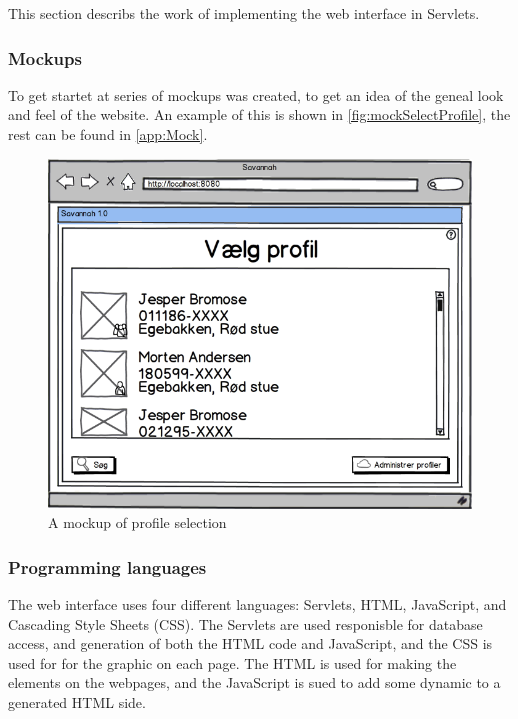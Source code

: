 This section describs the work of implementing the web interface in Servlets.

\subsubsection{Mockups}
To get startet at series of mockups was created, to get an idea of the geneal look and feel of the website. An example of this is shown in \autoref{fig:mockSelectProfile}, the rest can be found in \autoref{app:Mock}.

\begin{figure}[htbp]
	\centering
		\includegraphics[width=1.00\textwidth]{images/mockSelectProfile.png}
	\caption{A mockup of profile selection}
	\label{fig:mockSelectProfile}
\end{figure}

\subsubsection{Programming languages}
The web interface uses four different languages: Servlets, HTML, JavaScript, and Cascading Style Sheets (CSS). The Servlets are used responisble for database access, and generation of both the HTML code and JavaScript, and the CSS is used for for the graphic on each page. The HTML is used for making the elements on the webpages, and the JavaScript is sued to add some dynamic to a generated HTML side.

